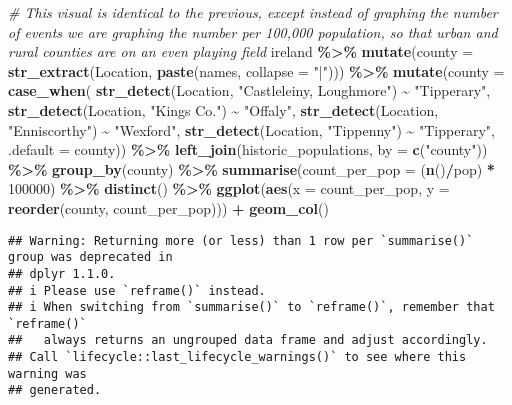 \documentclass[
]{article}
\newenvironment{Shaded}{\begin{snugshade}}{\end{snugshade}}
\newcommand{\AttributeTok}[1]{\textcolor[rgb]{0.13,0.29,0.53}{#1}}
\newcommand{\CommentTok}[1]{\textcolor[rgb]{0.56,0.35,0.01}{\textit{#1}}}
\newcommand{\DecValTok}[1]{\textcolor[rgb]{0.00,0.00,0.81}{#1}}
\newcommand{\FunctionTok}[1]{\textcolor[rgb]{0.13,0.29,0.53}{\textbf{#1}}}
\newcommand{\NormalTok}[1]{#1}
\newcommand{\SpecialCharTok}[1]{\textcolor[rgb]{0.81,0.36,0.00}{\textbf{#1}}}
\newcommand{\StringTok}[1]{\textcolor[rgb]{0.31,0.60,0.02}{#1}}
\begin{document}
\begin{Shaded}
\begin{Highlighting}[]
\CommentTok{\# This visual is identical to the previous, except instead of graphing the number of events we are graphing the number per 100,000 population, so that urban and rural counties are on an even playing field}
\NormalTok{ireland }\SpecialCharTok{\%\textgreater{}\%} 
  \FunctionTok{mutate}\NormalTok{(}\AttributeTok{county =} \FunctionTok{str\_extract}\NormalTok{(Location, }\FunctionTok{paste}\NormalTok{(names, }\AttributeTok{collapse =} \StringTok{"|"}\NormalTok{))) }\SpecialCharTok{\%\textgreater{}\%}
  \FunctionTok{mutate}\NormalTok{(}\AttributeTok{county =} \FunctionTok{case\_when}\NormalTok{(}
    \FunctionTok{str\_detect}\NormalTok{(Location, }\StringTok{"Castleleiny, Loughmore"}\NormalTok{) }\SpecialCharTok{\textasciitilde{}} \StringTok{"Tipperary"}\NormalTok{,}
    \FunctionTok{str\_detect}\NormalTok{(Location, }\StringTok{"King\textquotesingle{}s Co."}\NormalTok{) }\SpecialCharTok{\textasciitilde{}} \StringTok{"Offaly"}\NormalTok{,}
    \FunctionTok{str\_detect}\NormalTok{(Location, }\StringTok{"Enniscorthy"}\NormalTok{) }\SpecialCharTok{\textasciitilde{}} \StringTok{"Wexford"}\NormalTok{,}
    \FunctionTok{str\_detect}\NormalTok{(Location, }\StringTok{"Tippenny"}\NormalTok{) }\SpecialCharTok{\textasciitilde{}} \StringTok{"Tipperary"}\NormalTok{,}
    \AttributeTok{.default =}\NormalTok{ county)) }\SpecialCharTok{\%\textgreater{}\%}
  \FunctionTok{left\_join}\NormalTok{(historic\_populations, }\AttributeTok{by =} \FunctionTok{c}\NormalTok{(}\StringTok{"county"}\NormalTok{)) }\SpecialCharTok{\%\textgreater{}\%}
  \FunctionTok{group\_by}\NormalTok{(county) }\SpecialCharTok{\%\textgreater{}\%}
  \FunctionTok{summarise}\NormalTok{(}\AttributeTok{count\_per\_pop =}\NormalTok{ (}\FunctionTok{n}\NormalTok{()}\SpecialCharTok{/}\NormalTok{pop) }\SpecialCharTok{*} \DecValTok{100000}\NormalTok{) }\SpecialCharTok{\%\textgreater{}\%} \FunctionTok{distinct}\NormalTok{() }\SpecialCharTok{\%\textgreater{}\%}
  \FunctionTok{ggplot}\NormalTok{(}\FunctionTok{aes}\NormalTok{(}\AttributeTok{x =}\NormalTok{ count\_per\_pop, }\AttributeTok{y =} \FunctionTok{reorder}\NormalTok{(county, count\_per\_pop))) }\SpecialCharTok{+} 
  \FunctionTok{geom\_col}\NormalTok{()}
\end{Highlighting}
\end{Shaded}

\begin{verbatim}
## Warning: Returning more (or less) than 1 row per `summarise()` group was deprecated in
## dplyr 1.1.0.
## i Please use `reframe()` instead.
## i When switching from `summarise()` to `reframe()`, remember that `reframe()`
##   always returns an ungrouped data frame and adjust accordingly.
## Call `lifecycle::last_lifecycle_warnings()` to see where this warning was
## generated.
\end{verbatim}
\end{document}
